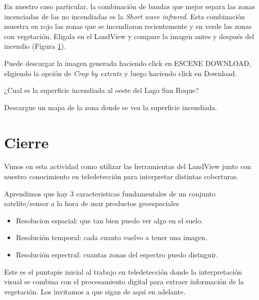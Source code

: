 \documentclass[a4paper,10pt]{article}
\begin{document}
En nuestro caso particular, la combinación de bandas que mejor separa las zonas incenciadas de las no incendiadas es la \emph{Short wave infrared}. Esta combinación muestra en rojo las zonas que se incendiaron recientemente y en verde las zonas con vegetación. Eligala en el LandView y compare la imagen antes y después del incendio (Figura \ref{fig:incendio}).

\begin{figure}[h!]
    \centering
    \caption{}
    \label{fig:incendio}
\end{figure}

Puede descargar la imagen generada haciendo click en ESCENE DOWNLOAD, eligiendo la opción de \emph{Crop by extente} y luego haciendo click en Download.

\begin{que}
    ¿Cual es la superficie incendiada al oeste del Lago San Roque?
\end{que}

\begin{que}
    Descargue un mapa de la zona donde se vea la superficie incendiada.
\end{que}

\section{Cierre}

Vimos en esta actividad como utilizar las herramientas del LandView junto con nuestro conocimiento en teledetección para interpretar distintas coberturas.

Aprendimos que hay 3 caracteristicas fundamentales de un conjunto satelite/sensor a la hora de usar productos geoespaciales

\begin{itemize}
    \item Resolucion espacial: que tan bien puedo ver algo en el suelo.
    \item Resolución temporal: cada cuanto vuelvo a tener una imagen.
    \item Resolución espectral: cuantas zonas del espectro puedo distnguir.
\end{itemize}

Este es el puntapie inicial al trabajo en teledetección donde la interpretación visual se combina con el procesamiento digital para extraer información de la vegetación. Los invitamos a que sigan de aquí en adelante.
\end{document}
